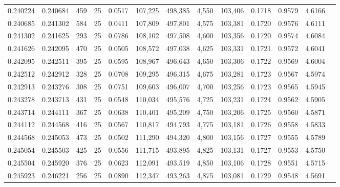 \begin{tabular}{rrrrrrrrrrrrr}
0.240224 & 0.240684 &   459 &  25 &                                     0.0517 & 107,225 & 498,385 &   4,550 & 103,406 & 0.1718 & 0.9579 & 4.6166 \\
0.240685 & 0.241302 &   584 &  25 &                                     0.0411 & 107,809 & 497,801 &   4,575 & 103,381 & 0.1720 & 0.9576 & 4.6111 \\
0.241302 & 0.241625 &   293 &  25 &                                     0.0786 & 108,102 & 497,508 &   4,600 & 103,356 & 0.1720 & 0.9574 & 4.6084 \\
0.241626 & 0.242095 &   470 &  25 &                                     0.0505 & 108,572 & 497,038 &   4,625 & 103,331 & 0.1721 & 0.9572 & 4.6041 \\
0.242095 & 0.242511 &   395 &  25 &                                     0.0595 & 108,967 & 496,643 &   4,650 & 103,306 & 0.1722 & 0.9569 & 4.6004 \\
0.242512 & 0.242912 &   328 &  25 &                                     0.0708 & 109,295 & 496,315 &   4,675 & 103,281 & 0.1723 & 0.9567 & 4.5974 \\
0.242913 & 0.243276 &   308 &  25 &                                     0.0751 & 109,603 & 496,007 &   4,700 & 103,256 & 0.1723 & 0.9565 & 4.5945 \\
0.243278 & 0.243713 &   431 &  25 &                                     0.0548 & 110,034 & 495,576 &   4,725 & 103,231 & 0.1724 & 0.9562 & 4.5905 \\
0.243714 & 0.244111 &   367 &  25 &                                     0.0638 & 110,401 & 495,209 &   4,750 & 103,206 & 0.1725 & 0.9560 & 4.5871 \\
0.244112 & 0.244568 &   416 &  25 &                                     0.0567 & 110,817 & 494,793 &   4,775 & 103,181 & 0.1726 & 0.9558 & 4.5833 \\
0.244568 & 0.245053 &   473 &  25 &                                     0.0502 & 111,290 & 494,320 &   4,800 & 103,156 & 0.1727 & 0.9555 & 4.5789 \\
0.245054 & 0.245503 &   425 &  25 &                                     0.0556 & 111,715 & 493,895 &   4,825 & 103,131 & 0.1727 & 0.9553 & 4.5750 \\
0.245504 & 0.245920 &   376 &  25 &                                     0.0623 & 112,091 & 493,519 &   4,850 & 103,106 & 0.1728 & 0.9551 & 4.5715 \\
0.245923 & 0.246221 &   256 &  25 &                                     0.0890 & 112,347 & 493,263 &   4,875 & 103,081 & 0.1729 & 0.9548 & 4.5691 \\

\end{tabular}
